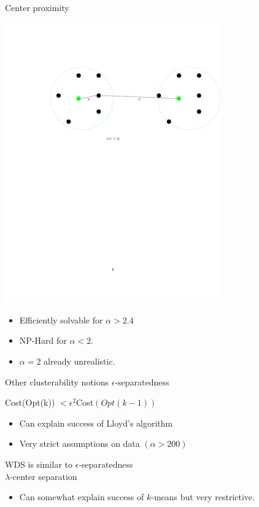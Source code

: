\documentclass{beamer}
\begin{document}
\begin{frame}{Center proximity}
	\begin{center}
	\includegraphics[trim={120 430 0 120},clip,width=0.7\textwidth]{figures/alphacp.pdf}
	\end{center}
	
	\begin{itemize}
		\item Efficiently solvable for $\alpha > 2.4$
		\item NP-Hard for $\alpha < 2$.
		\vspace{0.5cm}\item $\alpha = 2$ already \alert{unrealistic}.
	\end{itemize}
\end{frame}

\begin{frame}{Other clusterability notions}
	$\epsilon$-separatedness\\
	\begin{center}Cost(Opt(k)) $< \epsilon^2$Cost$(Opt(k-1))$\end{center}
	\begin{itemize}
		\item Can {\color{blue} explain success} of Lloyd's algorithm 
		\item \alert{Very strict} assumptions on data $(\alpha > 200)$
	\end{itemize}
	
	\vspace{0.5cm} WDS is similar to $\epsilon$-separatedness\\

	\vspace{0.5cm}$\lambda$-center separation
	\begin{itemize}
	\item Can somewhat {\color{blue} explain success} of $k$-means but \alert{very restrictive}.	 
	\end{itemize}
\end{frame}
\end{document}
